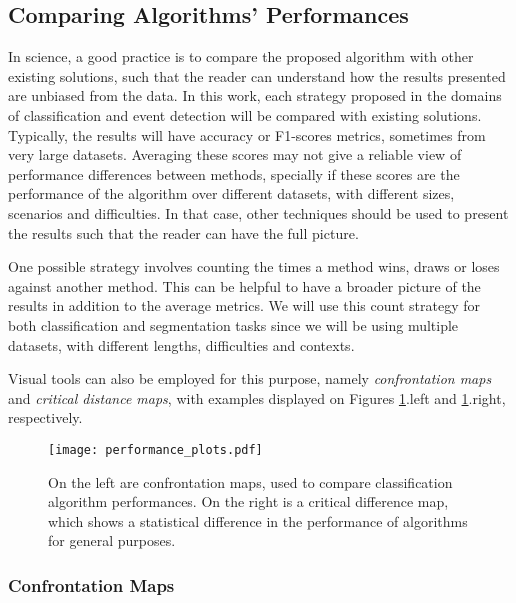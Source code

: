 \subsection{Comparing Algorithms' Performances}

In science, a good practice is to compare the proposed algorithm with other existing solutions, such that the reader can understand how the results presented are unbiased from the data. In this work, each strategy proposed in the domains of classification and event detection will be compared with existing solutions. Typically, the results will have accuracy or F1-scores metrics, sometimes from very large datasets. Averaging these scores may not give a reliable view of performance differences between methods, specially if these scores are the performance of the algorithm over different datasets, with different sizes, scenarios and difficulties. In that case, other techniques should be used to present the results such that the reader can have the full picture. 

One possible strategy involves counting the times a method wins, draws or loses against another method. This can be helpful to have a broader picture of the results in addition to the average metrics. We will use this count strategy for both classification and segmentation tasks since we will be using multiple datasets, with different lengths, difficulties and contexts. 

Visual tools can also be employed for this purpose, namely \textit{confrontation maps} and \textit{critical distance maps}, with examples displayed on Figures \ref{fig:performance_plots}.left and \ref{fig:performance_plots}.right, respectively.

\begin{figure}
\texttt{[image: performance\_plots.pdf]}
\caption{On the left are confrontation maps, used to compare classification algorithm performances. On the right is a critical difference map, which shows a statistical difference in the performance of algorithms for general purposes.}
\label{fig:performance_plots}
\end{figure}

\subsubsection{Confrontation Maps}
\label{sec:maps1}

